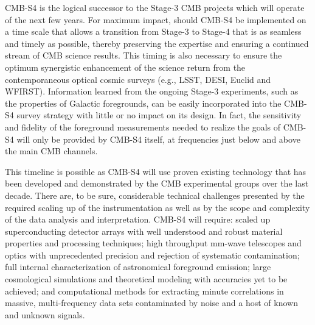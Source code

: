 %


CMB-S4 is the logical successor to the Stage-3 CMB projects which will operate of the next few years. For maximum impact, should CMB-S4 be implemented on a time scale that allows a transition from Stage-3 to Stage-4 that is as seamless and timely as possible, thereby preserving the expertise and ensuring a continued stream of CMB science results. This timing is also necessary to ensure the optimum synergistic enhancement of the science return from the contemporaneous optical cosmic surveys (e.g., LSST, DESI, Euclid and WFIRST).   Information learned from the ongoing Stage-3 experiments, such as the properties of Galactic foregrounds, can be easily incorporated into the CMB-S4 survey strategy with little or no impact on its design. In fact, the sensitivity and fidelity of the foreground measurements needed to realize the goals of CMB-S4 will only be provided by CMB-S4 itself, at frequencies just below and above the main CMB channels.

This timeline is possible as CMB-S4 will use proven existing technology that has been developed and demonstrated by the CMB experimental groups over the last decade. There are, to be sure, considerable technical challenges presented by the required scaling up of the instrumentation as well as by the scope and complexity of the data analysis and interpretation.  CMB-S4 will require: scaled up superconducting detector arrays with well understood and robust material properties and processing techniques; high throughput mm-wave telescopes and optics with unprecedented precision and rejection of systematic contamination; full internal characterization of astronomical foreground emission; large cosmological simulations and theoretical modeling with accuracies yet to be achieved; and computational methods for extracting minute correlations in massive, multi-frequency data sets contaminated by noise and a host of known and unknown signals. 


